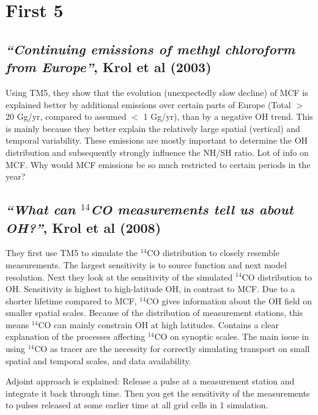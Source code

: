 

\toc

\section{First 5}

\subsection{\textit{“Continuing emissions of methyl chloroform from Europe”}, Krol et al (2003)}
Using TM5, they show that the evolution (unexpectedly slow decline) of MCF is explained better by additional emissions over certain parts of Europe (Total $>$ 20 Gg/yr, compared to assumed $<$ 1 Gg/yr), than by a negative OH trend. This is mainly because they better explain the relatively large spatial (vertical) and temporal variability. These emissions are mostly important to determine the OH distribution and subsequently strongly influence the NH/SH ratio. Lot of info on MCF.
Why would MCF emissions be so much restricted to certain periods in the year? 

\subsection{\textit{“What can $^{14}$CO measurements tell us about OH?”}, Krol et al (2008)}
They first use TM5 to simulate the $^{14}$CO distribution to closely resemble measurements. The largest sensitivity is to source function and next model resolution.
Next they look at the sensitivity of the simulated $^{14}$CO distribution to OH. Sensitivity is highest to high-latitude OH, in contrast to MCF. Due to a shorter lifetime compared to MCF, $^{14}$CO gives information about the OH field on smaller spatial scales. Because of the distribution of measurement stations, this means $^{14}$CO can mainly constrain OH at high latitudes. Contains a clear explanation of the processes affecting $^{14}$CO on synoptic scales. The main issue in using $^{14}$CO as tracer are the necessity for correctly simulating transport on small spatial and temporal scales, and data availability.

Adjoint approach is explained: Release a pulse at a measurement station and integrate it back through time. Then you get the sensitivity of the measurements to pulses released at some earlier time at all grid cells in 1 simulation.

